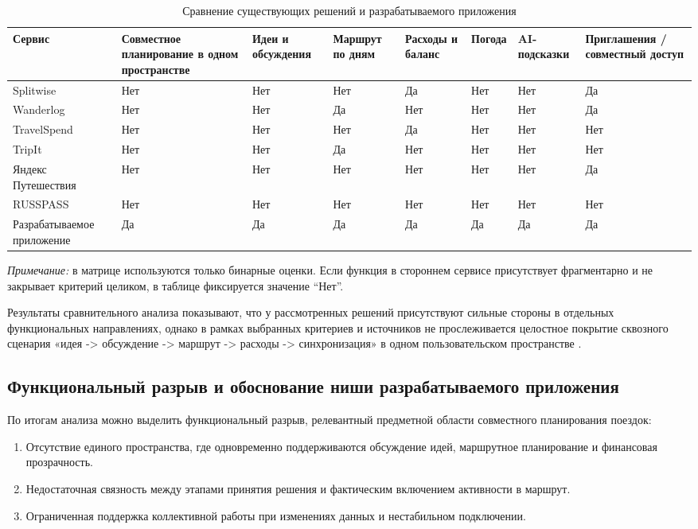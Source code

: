\begin{table}[H]
\centering
\scriptsize
\caption{Сравнение существующих решений и разрабатываемого приложения}
\setlength{\tabcolsep}{2pt}
\renewcommand{\arraystretch}{1.25}
\begin{tabularx}{\textwidth}{|p{2.4cm}|X|p{1.6cm}|p{1.4cm}|p{1.45cm}|p{1.1cm}|p{1.3cm}|p{1.9cm}|}
\hline
Сервис & Совместное планирование в одном пространстве & Идеи и обсуждения & Маршрут по дням & Расходы и баланс & Погода & AI-подсказки & Приглашения / совместный доступ \\ 
\hline
Splitwise & Нет & Нет & Нет & Да & Нет & Нет & Да \\ 
\hline
Wanderlog & Нет & Нет & Да & Нет & Нет & Нет & Да \\ 
\hline
TravelSpend & Нет & Нет & Нет & Да & Нет & Нет & Нет \\ 
\hline
TripIt & Нет & Нет & Да & Нет & Нет & Нет & Нет \\ 
\hline
Яндекс Путешествия & Нет & Нет & Нет & Нет & Нет & Нет & Да \\ 
\hline
RUSSPASS & Нет & Нет & Нет & Нет & Нет & Нет & Нет \\ 
\hline
Разрабатываемое приложение & Да & Да & Да & Да & Да & Да & Да \\ 
\hline
\end{tabularx}
\end{table}

\noindent\textit{Примечание:} в матрице используются только бинарные оценки. Если функция в стороннем сервисе присутствует фрагментарно и не закрывает критерий целиком, в таблице фиксируется значение ``Нет''.

Результаты сравнительного анализа показывают, что у рассмотренных решений присутствуют сильные стороны в отдельных функциональных направлениях, однако в рамках выбранных критериев и источников  не прослеживается целостное покрытие сквозного сценария «идея -> обсуждение -> маршрут -> расходы -> синхронизация» в одном пользовательском пространстве .

\subsection{Функциональный разрыв и обоснование ниши разрабатываемого приложения}
По итогам анализа можно выделить функциональный разрыв, релевантный предметной области совместного планирования поездок:
\begin{enumerate}
    \item Отсутствие единого пространства, где одновременно поддерживаются обсуждение идей, маршрутное планирование и финансовая прозрачность.
    \item Недостаточная связность между этапами принятия решения и фактическим включением активности в маршрут.
    \item Ограниченная поддержка коллективной работы при изменениях данных и нестабильном подключении.
\end{enumerate}


